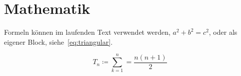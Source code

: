 \section{Mathematik}

Formeln können im laufenden Text verwendet werden, \(a^2 + b^2 = c^2\),
oder als eigener Block, siehe~\cref{eq:triangular}.

\begin{equation}
  \label{eq:triangular}
  T_n \coloneq \sum^{n}_{k=1} = \frac{n(n+1)}{2}
\end{equation}
